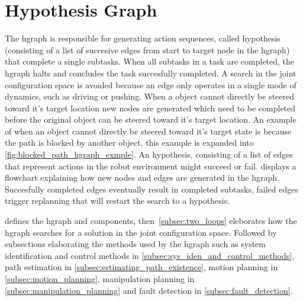 \section{Hypothesis Graph}%
\label{sec:hgraph}
The \ac{hgraph} is responsible for generating action sequences, called hypothesis (consisting of a list of succesive edges from start to target node in the \ac{hgraph}) that complete a single subtasks. When all subtasks in a task are completed, the \ac{hgraph} halts and concludes the task succesfully completed. A search in the joint configuration space is avoided because an edge only operates in a single mode of dynamics, such as driving or pushing. When a object cannot directly be steered toward it's target location new nodes are generated which need to be completed before the original object can be steered toward it's target location. An example of when an object cannot directly be steered toward it's target state is because the path is blocked by another object, this example is expanded into \cref{fig:blocked_path_hgraph_exmple}. An hypothesis, consisting of a list of edges that represent actions in the robot environment might succeed or fail.  displays a flowchart explaining how new nodes and edges are generated in the \ac{hgraph}. Succesfully completed edges eventually result in completed subtasks, failed edges trigger replanning that will restart the search to a hypothesis.\bs

 defines the \ac{hgraph} and components, then~\cref{subsec:two_loops} eleborates how the \ac{hgraph} searches for a solution in the joint configuration space. Followed by subsections elaborating the methods used by the \ac{hgraph} such as system identification and control methods in \cref{subsec:sys_iden_and_control_methods}, path estimation in \cref{subsec:estimating_path_existence}, motion planning in \cref{subsec:motion_planning}, manipulation planning in \cref{subsec:manipulation_planning} and fault detection in \cref{subsec:fault_detection}.\bs

